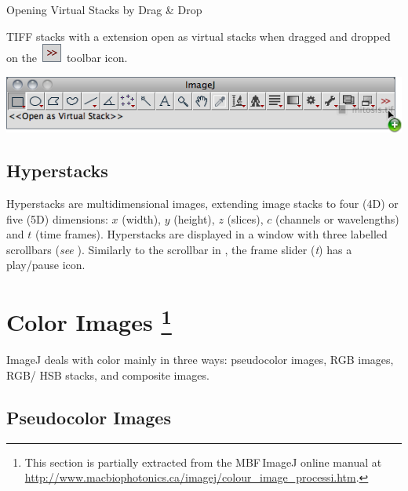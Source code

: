 \begin{infobox}
\caption{\label{infobox:VirtualTiff}Opening Virtual Stacks by Drag \& Drop}


\noindent TIFF stacks with a  extension
open as virtual stacks when dragged and dropped on the\textsf{~\includegraphics[scale=0.5]{images/tools/Switcher-small}~}toolbar
icon.\medskip{}


\noindent \centering{}\includegraphics[scale=0.55]{images/DragAndDropVirtualTiff}
\end{infobox}



\subsection*{Hyperstacks\label{sub:Hyperstacks-Intro}}

Hyperstacks are multidimensional images,
extending image stacks to four (4D) or five (5D) dimensions: $x$
(width), $y$ (height), $z$ (slices), $c$ (channels or wavelengths)
and $t$ (time frames). Hyperstacks are displayed in a window with
three labelled scrollbars (\emph{see} ).
Similarly to the scrollbar in , the frame
slider (\emph{t}) has a play/pause icon. 




\section[Color Images]{Color Images%
\footnote{This section is partially extracted from the MBF\,ImageJ online manual
at \protect\url{http://www.macbiophotonics.ca/imagej/colour_image_processi.htm}.%
}\label{sec:Color-Images}}

ImageJ deals with color mainly in three ways: pseudocolor
images, RGB images, RGB/ HS{\small B}
stacks, and composite images.


\subsection*{Pseudocolor Images\label{sub:Pseudocolor-Images}}

